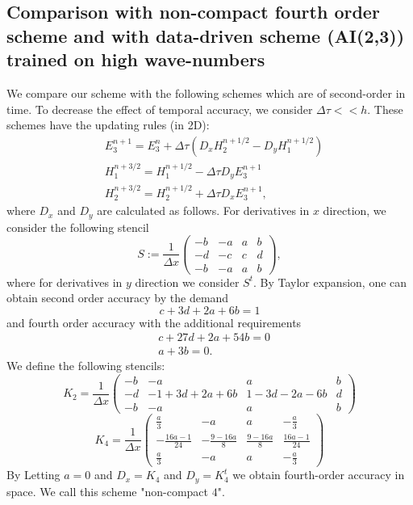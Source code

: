 \documentclass[12pt,reqno]{amsart}
\theoremstyle{definition}
\numberwithin{equation}{section}
\begin{document}
		\subsection{Comparison with non-compact fourth order scheme and with data-driven scheme (AI(2,3)) trained on high wave-numbers}
		We compare our scheme with the following schemes which are of second-order in time. To decrease the effect of temporal accuracy, we consider $\Delta \tau << h$.
		These schemes have the updating rules (in 2D):
		\begin{align*}
			&
E_3^{n+1}=E_3^n+\Delta \tau (D_x H_2^{n+1/2}-D_yH_1^{n+1/2})\\ &
H_1^{n+3/2}=H_1^{n+1/2}-\Delta \tau D_y E_3^{n+1} \\&
H_2^{n+3/2}=H_2^{n+1/2}+\Delta \tau D_x E_3^{n+1},
    \end{align*}
where $D_x$ and $D_y$ are calculated as follows.
       For derivatives in $x$ direction,  we consider the following stencil 
        				$$
        				S:=
        \frac{1}{\Delta x}
        \begin{pmatrix}
        	-b & -a & a & b \\
        	-d & -c& c &d \\
        	-b & -a & a & b
        \end{pmatrix},
        $$
        where for derivatives in $y$ direction we consider $S^t$.
        By Taylor expansion, one can obtain second order accuracy by the demand
        $$c+3d+2a+6b=1$$
        and fourth order accuracy with the additional requirements 
        \begin{align}
        	& c+27d+2a+54b=0 \\&
        	a+3b=0.
        \end{align}
We define the following stencils:
    $$
    K_2=
    \frac{1}{\Delta x}
    \begin{pmatrix}
    	-b & -a & a & b \\
    	-d & -1+3d+2a+6b& 1-3d-2a-6b &d \\
    	-b & -a & a & b
    \end{pmatrix}
    $$
    $$
    K_4=
    \frac{1}{\Delta x}
    \begin{pmatrix}
    	\frac{a}{3} &-a&a&-\frac{a}{3}  \\
    	-\frac{16a-1}{24}& - \frac{9-16a}{8}& \frac{9-16a}{8} &\frac{16a-1}{24} \\
    	\frac{a}{3}  & - a& a & -\frac{a}{3} 
    \end{pmatrix}
    $$
    By Letting $a=0$ and  $D_x=K_4$ and $D_y=K_4^t$ we obtain fourth-order accuracy in space. We call this scheme "non-compact $4$".
    
\end{document}
